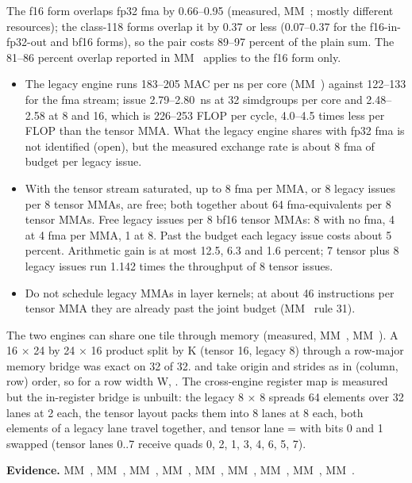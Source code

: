 The f16 form overlaps fp32 fma by 0.66–0.95 (measured, MM~; mostly different resources); the class-118 forms overlap it by 0.37 or less (0.07–0.37 for the f16-in-fp32-out and bf16 forms), so the
pair costs 89–97 percent of the plain sum. The 81–86 percent overlap reported in MM~ applies to the f16 form
only.

\begin{itemize}
\item The legacy engine runs 183–205 MAC per ns per core (MM~) against 122–133 for the fma stream; issue 2.79–2.80~ns at 32 simdgroups per
  core and 2.48–2.58 at 8 and 16, which is 226–253 FLOP per cycle, 4.0–4.5 times less per FLOP than the tensor MMA.
  What the legacy engine shares with fp32 fma is not identified (open), but the measured exchange rate is about 8 fma
  of budget per legacy issue.
\item With the tensor stream saturated, up to 8 fma per MMA, or 8 legacy issues per 8 tensor MMAs, are free; both
  together about 64 fma-equivalents per 8 tensor MMAs. Free legacy issues per 8 bf16 tensor MMAs: 8 with no fma, 4 at 4 fma per MMA,
  1 at 8. Past the budget each legacy issue costs about 5 percent. Arithmetic gain is at most 12.5, 6.3 and 1.6
  percent; 7 tensor plus 8 legacy issues run 1.142 times the throughput of 8 tensor issues.
\item Do not schedule legacy MMAs in layer kernels; at about 46 instructions per tensor MMA they are already past
  the joint budget (MM~ rule 31).
\end{itemize}

The two engines can share one tile through memory (measured, MM~, MM~). A 16 × 24 by 24 × 16 product split by K
(tensor 16, legacy 8) through a row-major memory bridge was exact on 32 of 32.  and  take origin and
strides as  in (column, row) order, so for a row width W, . The cross-engine register map
is measured but the in-register bridge is unbuilt: the legacy 8 × 8 spreads 64 elements over 32 lanes at 2 each, the
tensor layout packs them into 8 lanes at 8 each, both elements of a legacy lane travel together, and tensor lane =
 with bits 0 and 1 swapped (tensor lanes 0..7 receive quads 0, 2, 1, 3, 4, 6, 5, 7).

\textbf{Evidence.} MM~, MM~, MM~, MM~, MM~, MM~, MM~, MM~, MM~.

